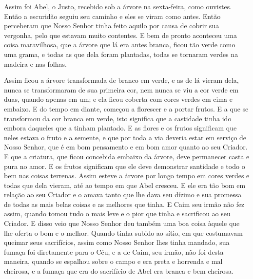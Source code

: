 Assim foi Abel, o Justo, recebido sob a árvore na sexta-feira, como ouvistes.
Então a escuridão seguiu seu caminho e eles se viram como antes. Então
perceberam que Nosso Senhor tinha feito aquilo por causa de cobrir sua
vergonha, pelo que estavam muito contentes. E bem de pronto aconteceu uma coisa
maravilhosa, que a árvore que lá era antes branca, ficou tão verde como uma
grama, e todas as que dela foram plantadas, todas se tornaram verdes na madeira
e nas folhas.

 Assim ficou a árvore transformada de branco em verde, e as de lá vieram dela,
nunca se transformaram de sua primeira cor, nem nunca se viu a cor verde em
duas, quando apenas em um; e ela ficou coberta com cores verdes em cima e
embaixo. E do tempo em diante, começou a florescer e a portar frutos. E a que
se transformou da cor branca em verde, isto significa que a castidade tinha ido
embora daqueles que a tinham plantado. E as flores e os frutos significam que
neles estava o fruto e a semente, e que por toda a via deveria estar em serviço
de Nosso Senhor, que é em bom pensamento e em bom amor quanto ao seu Criador. E
que a criatura, que ficou concebida embaixo da árvore, deve permanecer casta e
pura no amor. E os frutos significam que ele deve demonstrar santidade e todo o
bem nas coisas terrenas. Assim esteve a árvore por longo tempo em
cores verdes e todas que dela vieram, até ao tempo em que Abel cresceu. E ele
era tão bom em relação ao seu Criador e o amava tanto que lhe dava seu dízimo e
sua promessa de todas as mais belas coisas e as melhores que tinha. E Caim seu
irmão não fez assim, quando tomou tudo o mais leve e o pior que tinha e
sacrificou ao seu Criador. E disso veio que Nosso Senhor deu também uma boa
coisa àquele que lhe oferta o bom e o melhor. Quando tinha subido ao sítio, em
que costumavam queimar seus sacrifícios, assim como Nosso Senhor lhes tinha
mandado, sua fumaça foi diretamente para o Céu, e a de Caim, seu irmão, não foi
desta maneira, quando se espalhou sobre o campo e era preta e horrenda e mal
cheirosa, e a fumaça que era do sacrifício de Abel era branca e bem cheirosa.

